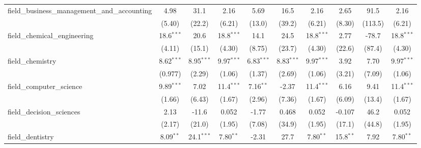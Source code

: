 \begin{tabular}{lccccccccc}
   field\_business\_management\_and\_accounting                & 4.98          & 31.1          & 2.16          & 5.69          & 16.5          & 2.16          & 2.65          & 91.5          & 2.16\\   
                                                               & (5.40)        & (22.2)        & (6.21)        & (13.0)        & (39.2)        & (6.21)        & (8.30)        & (113.5)       & (6.21)\\   
   field\_chemical\_engineering                                & 18.6$^{***}$  & 20.6          & 18.8$^{***}$  & 14.1          & 24.5          & 18.8$^{***}$  & 2.77          & -78.7         & 18.8$^{***}$\\   
                                                               & (4.11)        & (15.1)        & (4.30)        & (8.75)        & (23.7)        & (4.30)        & (22.6)        & (87.4)        & (4.30)\\   
   field\_chemistry                                            & 8.62$^{***}$  & 8.95$^{***}$  & 9.97$^{***}$  & 6.83$^{***}$  & 8.83$^{***}$  & 9.97$^{***}$  & 3.92          & 7.70          & 9.97$^{***}$\\   
                                                               & (0.977)       & (2.29)        & (1.06)        & (1.37)        & (2.69)        & (1.06)        & (3.21)        & (7.09)        & (1.06)\\   
   field\_computer\_science                                    & 9.89$^{***}$  & 7.02          & 11.4$^{***}$  & 7.16$^{**}$   & -2.37         & 11.4$^{***}$  & 6.16          & 9.41          & 11.4$^{***}$\\   
                                                               & (1.66)        & (6.43)        & (1.67)        & (2.96)        & (7.36)        & (1.67)        & (6.09)        & (13.4)        & (1.67)\\   
   field\_decision\_sciences                                   & 2.13          & -11.6         & 0.052         & -1.77         & 0.468         & 0.052         & -0.107        & 46.2          & 0.052\\   
                                                               & (2.17)        & (21.0)        & (1.95)        & (7.08)        & (34.9)        & (1.95)        & (17.1)        & (44.8)        & (1.95)\\   
   field\_dentistry                                            & 8.09$^{**}$   & 24.1$^{***}$  & 7.80$^{**}$   & -2.31         & 27.7          & 7.80$^{**}$   & 15.8$^{**}$   & 7.92          & 7.80$^{**}$\\   

\end{tabular}

